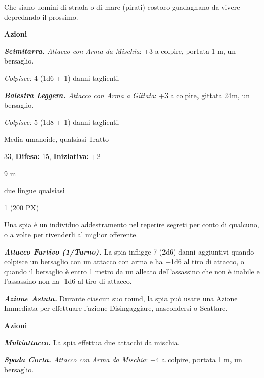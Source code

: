 \begin{multicols}{2}
{Che siano uomini di strada o di mare (pirati) costoro guadagnano da vivere depredando il prossimo.

\textbf{Azioni}

\emph{\textbf{Scimitarra.} Attacco con Arma da Mischia}: +3 a colpire, portata 1 m, un bersaglio.

\emph{Colpisce:} 4 (1d6 + 1) danni taglienti.

\emph{\textbf{Balestra Leggera.} Attacco con Arma a Gittata}: +3 a colpire, gittata 24m, un bersaglio.

\emph{Colpisce:} 5 (1d8 + 1) danni taglienti.

\begin{description}[noitemsep, topsep=0pt, parsep=0pt, partopsep=0pt, leftmargin=0cm, labelwidth=2.2cm]
    \item[\textbf{Taglia/Tipo:}] Media umanoide, qualsiasi Tratto
    \item[\textbf{Caratt.:}] 
    \item[\textbf{Punti Ferita:}] 33,  \textbf{Difesa:} 15,  \textbf{Iniziativa:} +2
    \item[\textbf{Tiri Salvez.:}] 
    \item[\textbf{Movimento:}] 9 m
    \item[\textbf{Linguaggi:}] due lingue qualsiasi
    \item[\textbf{Sfida:}] 1 (200 PX)\smallskip
\end{description}

Una spia è un individuo addestramento nel reperire segreti per conto di qualcuno, o a volte per rivenderli al miglior offerente.

\emph{\textbf{Attacco Furtivo (1/Turno).}} La spia infligge 7 (2d6) danni aggiuntivi quando colpisce un bersaglio con un attacco con arma e ha +1d6 al tiro di attacco, o quando il bersaglio è entro 1 metro da un alleato dell'assassino che non è inabile e l'assassino non ha -1d6 al tiro di attacco.

\emph{\textbf{Azione Astuta.}} Durante ciascun suo round, la spia può usare una Azione Immediata per effettuare l'azione Disingaggiare, nascondersi o Scattare.

\textbf{Azioni}

\emph{\textbf{Multiattacco.}} La spia effettua due attacchi da mischia.

\emph{\textbf{Spada Corta.} Attacco con Arma da Mischia}: +4 a colpire, portata 1 m, un bersaglio.

}
\end{multicols}
